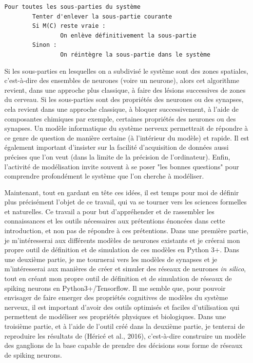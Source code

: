 \documentclass[12pt]{scrartcl}
\begin{document}
\begin{enumerate}
\begin{verbatim}
Pour toutes les sous-parties du système 
        Tenter d'enlever la sous-partie courante 
        Si M(C) reste vraie : 
                On enlève définitivement la sous-partie 
        Sinon : 
                On réintègre la sous-partie dans le système
\end{verbatim}
Si les sous-parties en lesquelles on a subdivisé le système sont des zones spatiales, c'est-à-dire des ensembles de neurones (voire un neurone), alors cet algorithme revient, dans une approche plus classique, à faire des lésions successives de zones du cerveau. Si les sous-parties sont des propriétés des neurones ou des synapses, cela revient dans une approche classique, à bloquer successivement, à l'aide de composantes chimiques par exemple, certaines propriétés des neurones ou des synapses. 
Un modèle informatique du système nerveux permettrait de répondre à ce genre de question de manière certaine (à l'intérieur du modèle) et rapide. Il est également important d'insister sur la facilité d'acquisition de données aussi précises que l'on veut (dans la limite de la précision de l'ordinateur). Enfin, l'activité de modélisation invite souvent à se poser "les bonnes questions" pour comprendre profondément le système que l'on cherche à modéliser. \\ \end{enumerate}

Maintenant, tout en gardant en tête ces idées, il est temps pour moi de définir plus précisément l'objet de ce travail, qui va se tourner vers les sciences formelles et naturelles. Ce travail a pour but d'appréhender et de rassembler les connaissances et les outils nécessaires aux prétentions énoncées dans cette introduction, et non pas de répondre à ces prétentions. 
Dans une première partie, je m'intéresserai aux différents modèles de neurones existants et je créerai mon propre outil de définition et de simulation de ces modèles en Python 3+. Dans une deuxième partie, je me tournerai vers les modèles de synapses et je m'intéresserai aux manières de créer et simuler des réseaux de neurones \textit{in silico}, tout en créant mon propre outil de définition et de simulation de réseaux de spiking neurons en Python3+/Tensorflow. Il me semble que, pour pouvoir envisager de faire emerger des propriétés cognitives de modèles du système nerveux, il est important d'avoir des outils optimisés et faciles d'utilisation qui permettent de modéliser ses propriétés physiques et biologiques. Dans une troisième partie, et à l'aide de l'outil créé dans la deuxième partie, je tenterai de reproduire les résultats de (Héricé et al., 2016), c'est-à-dire construire un modèle des ganglions de la base capable de prendre des décisions sous forme de réseaux de spiking neurons.
\pagebreak
\end{document}
